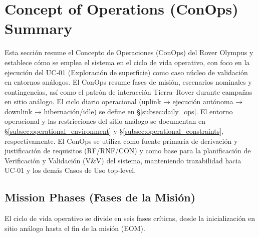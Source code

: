 
\section{Concept of Operations (ConOps) Summary}\label{sec:conops}

Esta sección resume el Concepto de Operaciones (ConOps) del Rover Olympus y establece cómo se emplea el sistema en el ciclo de vida operativo, con foco en la ejecución del UC‑01 (Exploración de superficie) como caso núcleo de validación en entornos análogos.
El ConOps resume fases de misión, escenarios nominales y contingencias, así como el patrón de interacción Tierra–Rover durante campañas en sitio análogo. El ciclo diario operacional (uplink → ejecución autónoma → downlink → hibernación/idle) se define en §\ref{subsec:daily_ops}. El entorno operacional y las restricciones del sitio análogo se documentan en §\ref{subsec:operational_environment} y §\ref{subsec:operational_constraints}, respectivamente.
El ConOps se utiliza como fuente primaria de derivación y justificación de requisitos (RF/RNF/CON) y como base para la planificación de Verificación y Validación (V\&V) del sistema, manteniendo trazabilidad hacia UC‑01 y los demás Casos de Uso top‑level.

\subsection{Mission Phases (Fases de la Misión)}\label{subsec:mission_phases}
El ciclo de vida operativo se divide en seis fases críticas, desde la inicialización en sitio análogo hasta el fin de la misión (EOM).

